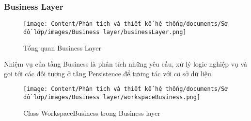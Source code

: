 \subsubsection{Business Layer}

\begin{figure}[H]
    \centering
    \texttt{[image: Content/Phân tích và thiết kế hệ thống/documents/Sơ đồ lớp/images/Business layer/businessLayer.png]}
    \vspace{0.5cm}
    \caption{Tổng quan Business Layer}
    \label{fig:Tổng quan Business Layer}
\end{figure}

Nhiệm vụ của tầng Business là phân tích những yêu cầu, xử lý logic nghiệp vụ và
gọi tới các đối tượng ở tầng Persistence để tương tác với cơ sở dữ liệu.

\begin{figure}[H]
    \centering
    \texttt{[image: Content/Phân tích và thiết kế hệ thống/documents/Sơ đồ lớp/images/Business layer/workspaceBusiness.png]}
    \vspace{0.5cm}
    \caption{Class WorkspaceBusiness trong Business layer}
    \label{fig:Class WorkspaceBusiness trong Business layer}
\end{figure}

